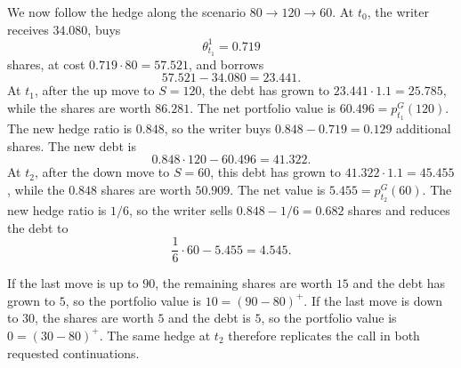 \begin{solution}
\begin{center}
\end{center}

We now follow the hedge along the scenario \(80\to120\to60\).  At \(t_0\),
the writer receives \(34.080\), buys
\[
  \theta^1_{t_1}=0.719
\]
shares, at cost \(0.719\cdot80=57.521\), and borrows
\[
  57.521-34.080=23.441.
\]
At \(t_1\), after the up move to \(S=120\), the debt has grown to
\(23.441\cdot1.1=25.785\), while the shares are worth \(86.281\).  The net
portfolio value is \(60.496=p^G_{t_1}(120)\).  The new hedge ratio is
\(0.848\), so the writer buys \(0.848-0.719=0.129\) additional shares.  The
new debt is
\[
  0.848\cdot120-60.496=41.322.
\]
At \(t_2\), after the down move to \(S=60\), this debt has grown to
\(41.322\cdot1.1=45.455\), while the \(0.848\) shares are worth \(50.909\).
The net value is \(5.455=p^G_{t_2}(60)\).  The new hedge ratio is \(1/6\), so
the writer sells \(0.848-1/6=0.682\) shares and reduces the debt to
\[
  \frac16\cdot60-5.455=4.545.
\]

If the last move is up to \(90\), the remaining shares are worth \(15\) and
the debt has grown to \(5\), so the portfolio value is \(10=(90-80)^+\).  If
the last move is down to \(30\), the shares are worth \(5\) and the debt is
\(5\), so the portfolio value is \(0=(30-80)^+\).  The same hedge at \(t_2\)
therefore replicates the call in both requested continuations.
\end{solution}
